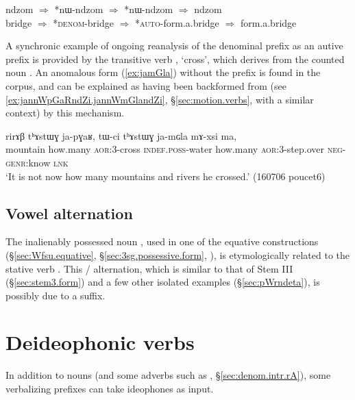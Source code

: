 \begin{exe}
\ex \label{ex:nW.backformation}
\gll   ndzom $\Rightarrow$ *nɯ-ndzom $\Rightarrow$ *nɯ-ndzom $\Rightarrow$ ndzom \\
bridge $\Rightarrow$ *\textsc{denom}-bridge  $\Rightarrow$ *\textsc{auto}-form.a.bridge $\Rightarrow$  form.a.bridge \\
\end{exe}

A synchronic example of ongoing reanalysis of the  denominal prefix as an autive prefix is provided by the transitive verb , `cross', which derives from the counted noun . An anomalous form  (\ref{ex:jamGla}) without the  prefix is found in the corpus, and can be explained as having been backformed from  (see \ref{ex:jannWpGaRndZi.jannWmGlandZi}, §\ref{sec:motion.verbs}, with a similar context) by this mechanism.
 
\begin{exe}
\ex \label{ex:jamGla}
\gll rirɤβ tʰɤstɯɣ ja-pɣaʁ, tɯ-ci tʰɤstɯɣ ja-mɢla mɤ-xsi ma, \\
mountain how.many \textsc{aor}:3\flobv{}-cross \textsc{indef}.\textsc{poss}-water how.many \textsc{aor}:3\flobv{}-step.over \textsc{neg}-\textsc{genr}:know \textsc{lnk} \\
\glt `It is not now how many mountains and rivers he crossed.' (160706 poucet6)
\end{exe}


\subsection{Vowel alternation}  \label{sec:fsu.fse}
The inalienably possessed noun , used in one of the equative constructions (§\ref{sec:Wfsu.equative}, §\ref{sec:3sg.possessive.form}, \citealt{jacques18similative}), is etymologically related to the stative verb . This  /  alternation, which is similar to that of Stem III (§\ref{sec:stem3.form}) and a few other isolated examples (§\ref{sec:pWrndeta}), is possibly due to a  suffix.

 
\section{Deideophonic verbs}  \label{sec:voice.deideophonic}
In addition to nouns (and some adverbs such as  , §\ref{sec:denom.intr.rA}), some verbalizing prefixes can take ideophones as input. 


